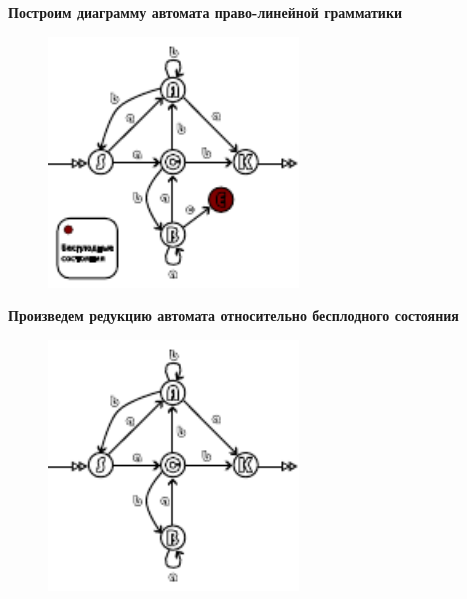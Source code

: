 \documentclass[a4paper, 14pt]{extarticle}
\begin{document}
\newpage

\vfill

\begin{center}
  \normalsize
  \bfseries
  Построим диаграмму автомата право-линейной грамматики
\end{center}

\begin{figure}[h]
  \centering
  \includegraphics[width=0.5925\textwidth,height=0.5925\textheight,keepaspectratio]{graphics/diagramm1}
\end{figure}

\begin{center}
  \normalsize
  \bfseries
  Произведем редукцию автомата относительно бесплодного состояния
\end{center}

\begin{figure}[h]
  \centering
  \includegraphics[width=0.5925\textwidth,height=0.5925\textheight,keepaspectratio]{graphics/diagramm2}
\end{figure}
\end{document}

